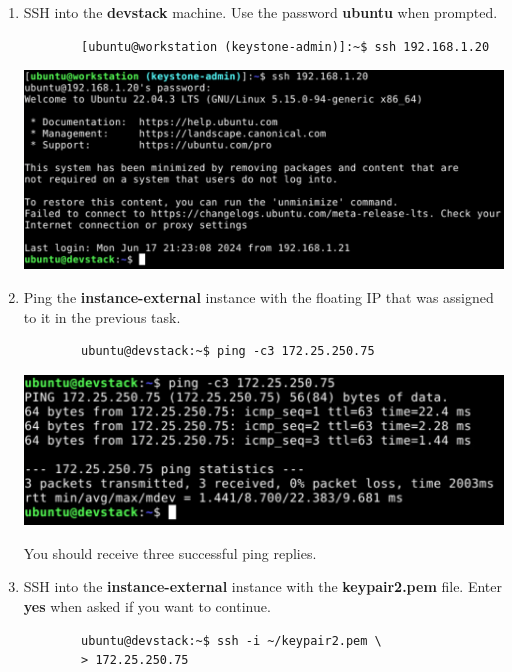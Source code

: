 \documentclass[letterpaper, 12pt]{article}
\begin{document}
\begin{enumerate}
    \item SSH into the \textbf{devstack} machine.
    Use the password \textbf{ubuntu} when prompted.
    \begin{lstlisting}
        [ubuntu@workstation (keystone-admin)]:~$ ssh 192.168.1.20
    \end{lstlisting}

    \begin{center}
        \includegraphics[width=\linewidth]{images/part6/step8.png}
    \end{center}

    \item Ping the \textbf{instance-external} instance with the floating IP that was assigned to it in the previous task.
    \begin{lstlisting}
        ubuntu@devstack:~$ ping -c3 172.25.250.75
    \end{lstlisting}

    \begin{center}
        \includegraphics[width=\linewidth]{images/part6/step9.png}
    \end{center}

    \begin{notebox}
        You should receive three successful ping replies.
    \end{notebox}

    \item SSH into the \textbf{instance-external} instance with the \textbf{keypair2.pem} file.
    Enter \textbf{yes} when asked if you want to continue.
    \begin{lstlisting}
        ubuntu@devstack:~$ ssh -i ~/keypair2.pem \
        > 172.25.250.75
    \end{lstlisting}


\end{enumerate}
\end{document}

